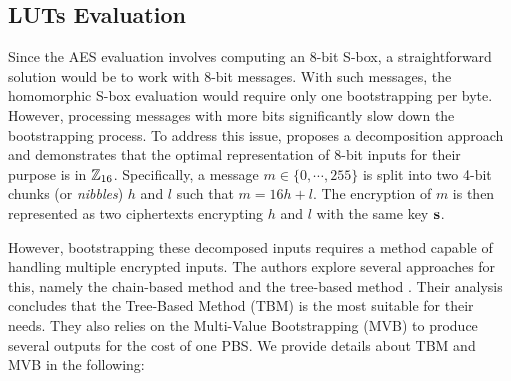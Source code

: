 \subsection{LUTs Evaluation} 
Since the AES evaluation involves computing an 8-bit S-box, a straightforward solution would be to work with 8-bit messages. With such messages, the homomorphic S-box evaluation would require only one bootstrapping per byte. However, processing messages with more bits significantly slow down the bootstrapping process. To address this issue, \cite{DBLP:conf/wahc/TramaCBS23} proposes a decomposition approach and demonstrates that the optimal representation of 8-bit inputs for their purpose is in $\mathbb{Z}_{16}$. Specifically, a message $m \in \{0, \cdots, 255\}$ is split into two 4-bit chunks (or \emph{nibbles}) $h$ and $l$ such that $m = 16h+l$. The encryption of $m$ is then represented as two ciphertexts encrypting $h$ and $l$ with the same key $\mathbf s$.

However, bootstrapping these decomposed inputs requires a method capable of handling multiple encrypted inputs. The authors explore several approaches for this, namely the chain-based method and the tree-based method \cite{TCHES:GuiBorAra21}. Their analysis concludes that the Tree-Based Method (TBM) is the most suitable for their needs. They also relies on the Multi-Value Bootstrapping (MVB) to produce several outputs for the cost of one PBS. We provide details about TBM and MVB in the following:

